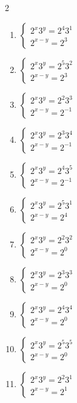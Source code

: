 \documentclass[12pt,a4paper]{article}
\begin{document}
\begin{multicols}{2}
\begin{enumerate}[leftmargin=*, itemsep=6pt]
\item \(\begin{cases} 2^x3^y=2^{4}3^{1}\\ 2^{x-y}=2^{3}\end{cases}\)

\item \(\begin{cases} 2^x3^y=2^{5}3^{2}\\ 2^{x-y}=2^{3}\end{cases}\)

\item \(\begin{cases} 2^x3^y=2^{2}3^{3}\\ 2^{x-y}=2^{-1}\end{cases}\)

\item \(\begin{cases} 2^x3^y=2^{3}3^{4}\\ 2^{x-y}=2^{-1}\end{cases}\)

\item \(\begin{cases} 2^x3^y=2^{4}3^{5}\\ 2^{x-y}=2^{-1}\end{cases}\)

\item \(\begin{cases} 2^x3^y=2^{5}3^{1}\\ 2^{x-y}=2^{4}\end{cases}\)

\item \(\begin{cases} 2^x3^y=2^{2}3^{2}\\ 2^{x-y}=2^{0}\end{cases}\)

\item \(\begin{cases} 2^x3^y=2^{3}3^{3}\\ 2^{x-y}=2^{0}\end{cases}\)

\item \(\begin{cases} 2^x3^y=2^{4}3^{4}\\ 2^{x-y}=2^{0}\end{cases}\)

\item \(\begin{cases} 2^x3^y=2^{5}3^{5}\\ 2^{x-y}=2^{0}\end{cases}\)

\item \(\begin{cases} 2^x3^y=2^{2}3^{1}\\ 2^{x-y}=2^{1}\end{cases}\)

\end{enumerate}
\end{multicols}
\newpage
\end{document}
